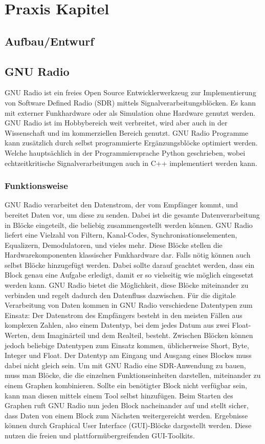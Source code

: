 
\chapter{Praxis Kapitel}
\section{Aufbau/Entwurf}
\section{GNU Radio}
GNU  Radio  ist  ein  freies  Open  Source  Entwicklerwerkzeug  zur  Implementierung von Software Defined Radio (SDR) mittels Signalverarbeitungsblöcken. Es kann mit externer Funkhardware oder als Simulation ohne Hardware genutzt werden. GNU Radio ist im Hobbybereich weit verbreitet, wird aber auch in der Wissenschaft und im kommerziellen Bereich genutzt. GNU Radio Programme kann zusätzlich  durch selbst programmierte Ergänzungsblöcke optimiert werden. Welche hauptsächlich in der Programmiersprache Python geschrieben, wobei echtzeitkritische Signalverarbeitungen auch in C++ implementiert werden kann.
\subsection{Funktionsweise}
GNU Radio verarbeitet den Datenstrom, der vom Empfänger kommt, und bereitet Daten vor, um diese zu senden. Dabei ist die gesamte Datenverarbeitung in Blöcke eingeteilt,  die  beliebig  zusammengestellt  werden können. GNU Radio liefert eine Vielzahl von Filtern, Kanal-Codes, Synchronisationselementen, Equalizern, Demodulatoren, und vieles mehr. Diese  Blöcke  stellen  die  Hardwarekomponenten  klassischer  Funkhardware  dar. Falls nötig können auch selbst Blöcke hinzugefügt werden. Dabei sollte darauf geachtet werden, dass ein Block genau eine Aufgabe erledigt, damit er so vielseitig wie möglich eingesetzt werden kann. GNU Radio bietet die Möglichkeit, diese Blöcke miteinander zu verbinden und regelt dadurch den Datenfluss dazwischen. Für die digitale Verarbeitung von Daten kommen in GNU Radio verschiedene Datentypen zum Einsatz: Der Datenstrom des Empfängers besteht in den meisten Fällen aus komplexen Zahlen, also einem Datentyp, bei dem jedes Datum aus zwei Float-Werten, dem Imaginärteil und dem Realteil, besteht. Zwischen Blöcken können jedoch beliebige Datentypen zum Einsatz kommen, üblicherweise Short, Byte, Integer und Float. Der Datentyp am Eingang und Ausgang eines Blockes muss dabei nicht gleich sein.
Um mit GNU Radio eine SDR-Anwendung zu bauen, muss man Blöcke, die die einzelnen Funktionseinheiten darstellen, miteinander zu einem Graphen kombinieren. Sollte ein benötigter Block nicht verfügbar sein, kann man diesen mittels einem Tool selbst hinzufügen. Beim Starten des Graphen ruft GNU Radio nun jeden Block nacheinander auf und stellt sicher, dass Daten von einem Block zum Nächsten weitergereicht werden. Ergebnisse  können  durch  Graphical  User  Interface  (GUI)-Blöcke dargestellt werden. Diese nutzen die freien und plattformübergreifenden GUI-Toolkits.
